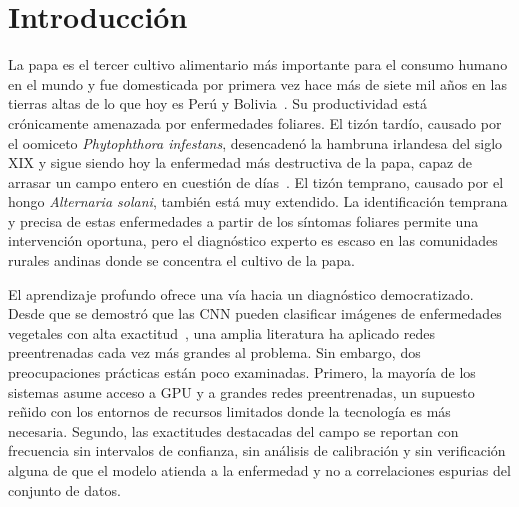 \documentclass[10pt]{article}
\begin{document}
\section{Introducción}
La papa es el tercer cultivo alimentario más importante para el consumo humano en el
mundo y fue domesticada por primera vez hace más de siete mil años en las tierras
altas de lo que hoy es Perú y Bolivia~\cite{fao2008potato}. Su productividad está
crónicamente amenazada por enfermedades foliares. El tizón tardío, causado por el
oomiceto \textit{Phytophthora infestans}, desencadenó la hambruna irlandesa del siglo
XIX y sigue siendo hoy la enfermedad más destructiva de la papa, capaz de arrasar un
campo entero en cuestión de días~\cite{fry2008phytophthora}. El tizón temprano,
causado por el hongo \textit{Alternaria solani}, también está muy extendido. La
identificación temprana y precisa de estas enfermedades a partir de los síntomas
foliares permite una intervención oportuna, pero el diagnóstico experto es escaso en
las comunidades rurales andinas donde se concentra el cultivo de la papa.

El aprendizaje profundo ofrece una vía hacia un diagnóstico democratizado. Desde que
se demostró que las CNN pueden clasificar imágenes de enfermedades vegetales con alta
exactitud~\cite{mohanty2016using,ferentinos2018deep}, una amplia literatura ha
aplicado redes preentrenadas cada vez más grandes al problema. Sin embargo, dos
preocupaciones prácticas están poco examinadas. Primero, la mayoría de los sistemas
asume acceso a GPU y a grandes redes preentrenadas, un supuesto reñido con los
entornos de recursos limitados donde la tecnología es más necesaria. Segundo, las
exactitudes destacadas del campo se reportan con frecuencia sin intervalos de
confianza, sin análisis de calibración y sin verificación alguna de que el modelo
atienda a la enfermedad y no a correlaciones espurias del conjunto de datos.
\end{document}
